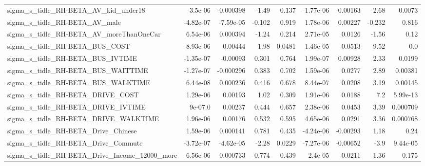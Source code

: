 \begin{tabular}{lrrrrrrrr}
sigma\_s\_tidle\_RH-BETA\_AV\_kid\_under18               &    -3.5e-06 &    -0.000398 &    -1.49 &    0.137 &  -1.77e-06 &    -0.00163 &        -2.68 &        0.0073 \\
sigma\_s\_tidle\_RH-BETA\_AV\_male                      &   -4.82e-07 &    -7.59e-05 &   -0.102 &    0.919 &   1.78e-06 &     0.00227 &       -0.232 &         0.816 \\
sigma\_s\_tidle\_RH-BETA\_AV\_moreThanOneCar            &    6.54e-06 &     0.000394 &    -1.24 &    0.214 &   2.71e-05 &      0.0126 &        -1.56 &          0.12 \\
sigma\_s\_tidle\_RH-BETA\_BUS\_COST                     &    8.93e-06 &      0.00444 &     1.98 &   0.0481 &   1.46e-05 &      0.0513 &         9.52 &           0.0 \\
sigma\_s\_tidle\_RH-BETA\_BUS\_IVTIME                   &   -1.35e-07 &     -0.00093 &    0.301 &    0.764 &   1.99e-07 &     0.00928 &         2.33 &        0.0199 \\
sigma\_s\_tidle\_RH-BETA\_BUS\_WAITTIME                 &   -1.27e-07 &    -0.000296 &    0.383 &    0.702 &   1.59e-06 &      0.0277 &         2.89 &       0.00381 \\
sigma\_s\_tidle\_RH-BETA\_BUS\_WALKTIME                 &    6.44e-08 &     0.000236 &    0.416 &    0.678 &   8.44e-07 &      0.0208 &         3.19 &       0.00145 \\
sigma\_s\_tidle\_RH-BETA\_DRIVE\_COST                   &    1.29e-06 &      0.00193 &     1.02 &    0.309 &   1.91e-06 &      0.0188 &          7.2 &      5.99e-13 \\
sigma\_s\_tidle\_RH-BETA\_DRIVE\_IVTIME                 &     9e-07.0 &      0.00237 &    0.444 &    0.657 &   2.38e-06 &      0.0453 &         3.39 &      0.000709 \\
sigma\_s\_tidle\_RH-BETA\_DRIVE\_WALKTIME               &    1.96e-06 &      0.00176 &    0.532 &    0.595 &   4.65e-06 &      0.0291 &         3.36 &      0.000768 \\
sigma\_s\_tidle\_RH-BETA\_Drive\_Chinese                &    1.59e-06 &     0.000141 &    0.781 &    0.435 &  -4.24e-06 &    -0.00293 &         1.18 &          0.24 \\
sigma\_s\_tidle\_RH-BETA\_Drive\_Commute                &   -3.72e-07 &    -4.62e-05 &    -2.28 &   0.0229 &  -7.27e-06 &    -0.00652 &         -3.9 &      9.44e-05 \\
sigma\_s\_tidle\_RH-BETA\_Drive\_Income\_12000\_more      &    6.56e-06 &     0.000733 &   -0.774 &    0.439 &    2.4e-05 &      0.0211 &        -1.36 &         0.175 \\

\end{tabular}
